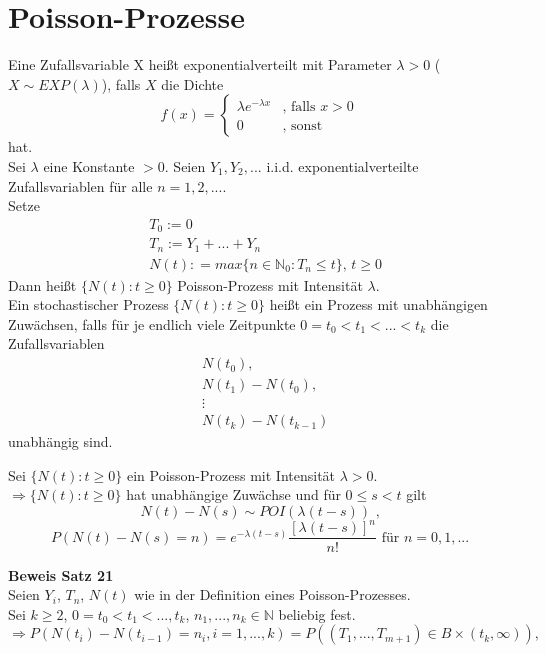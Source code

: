 \documentclass[a4paper,12pt]{article}
\begin{document}
\section{Poisson-Prozesse}
Eine Zufallsvariable X heißt exponentialverteilt mit Parameter $\lambda > 0$ ($X \sim EXP(\lambda)$), falls $X$ die Dichte
$$
f(x) = 
\begin{cases}
\lambda e ^{-\lambda x} & \text{, falls } x > 0\\
0 & \text{, sonst}
\end{cases}
$$
hat.\\
Sei $\lambda$ eine Konstante $>0$. Seien $Y_1, Y_2, ...$ i.i.d. exponentialverteilte Zufallsvariablen für alle $n=1,2,...$.\\
Setze
\begin{align*}
&T_0:= 0 \\
&T_n:= Y_1 + ... + Y_n \\
&N(t): = max\{n \in \mathbb{N}_0:T_n \leq t\} \text{, } t \geq 0
\end{align*}
Dann heißt $\{N(t):t \geq 0\}$ Poisson-Prozess mit Intensität $\lambda$.\\
Ein stochastischer Prozess $\{N(t): t \geq 0\}$ heißt ein Prozess mit unabhängigen 
Zuwächsen, falls für je endlich viele Zeitpunkte
$
0 = t_0 < t_1 < ... < t_k
$ die Zufallsvariablen
\begin{align*}
&N(t_0), \\
& N(t_1) - N(t_0), \\
& \vdots \\
& N(t_k) - N(t_{k-1})
\end{align*}
unabhängig sind.\\
\begin{tcolorbox}[breakable, colframe=green, colback=white, title=Satz 21]
Sei $\{N(t):t \geq 0\}$ ein Poisson-Prozess mit Intensität $\lambda > 0$.\\
$\Rightarrow \{N(t):t \geq 0\}$ hat unabhängige Zuwächse und für 
$0 \leq s < t$ gilt 
$$
N(t) - N(s) \sim POI(\lambda(t-s)) \text{ ,}
$$
$$
P(N(t) - N(s) = n) = e^{-\lambda(t-s)} \frac{[\lambda(t-s)]^n}{n!} \text{ für } n=0,1,...
$$
\end{tcolorbox}
\textbf{Beweis Satz 21}\\
Seien $Y_i$, $T_n$, $N(t)$ wie in der Definition eines Poisson-Prozesses.\\
Sei $k \geq 2$, $0 = t_0 < t_1 < ..., t_k$,
$n_1, ..., n_k \in \mathbb{N}$ beliebig fest.
$$
\Rightarrow P(N(t_i) - N(t_{i-1}) = n_i, i=1, ..., k) = P((T_1, ..., T_{m+1}) \in B \times (t_k, \infty)),
$$
\end{document}
